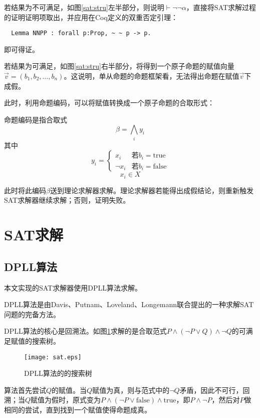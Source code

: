 若结果为不可满足，如图\ref{sat:stru}左半部分，则说明$\vdash \lnot \lnot \alpha$，直接将SAT求解过程的证明证明项取出，并应用在Coq定义的双重否定引理：
\begin{verbatim}
  Lemma NNPP : forall p:Prop, ~ ~ p -> p.
\end{verbatim}
即可得证。

若结果为可满足，如图\ref{sat:stru}右半部分，将得到一个原子命题的赋值向量$\vec{v}=(b_1, b_2, \dots , b_n)$。这说明，单从命题的命题框架看，无法得出命题在赋值$\vec{v}$下成假。

此时，利用命题编码，可以将赋值转换成一个原子命题的合取形式：
\begin{definition}[命题编码]命题编码是指合取式
  $$\beta = \bigwedge_i y_i$$
  其中
  \begin{equation*}
    y_i =
    \begin{cases}
      x_i & \text{若}b_i = \mathrm{true} \\
      \lnot x_i & \text{若}b_i = \mathrm{false}
    \end{cases}
  \end{equation*}
  $$ x_i \in X $$
\end{definition}


此时将此编码$\beta$送到理论求解器求解。理论求解器若能得出成假结论，则重新触发SAT求解器继续求解；否则，证明失败。

\section{SAT求解}
\subsection{DPLL算法}
本文实现的SAT求解器使用DPLL算法求解。

DPLL算法是由Davis、Putnam、Loveland、Longemann联合提出的一种求解SAT问题的完备方法。

DPLL算法的核心是回溯法。如图\ref{sat:dpll}求解的是合取范式$P \land (\lnot P \lor Q) \land \lnot Q$的可满足赋值的搜索树。

\begin{figure}[!htbp]
  \centering
  \texttt{[image: sat.eps]}
  \caption{DPLL算法的的搜索树}
  \label{sat:dpll}
\end{figure}

算法首先尝试$Q$的赋值。当$Q$赋值为真，则与范式中的$\lnot Q$矛盾，因此不可行，回溯；当$Q$赋值为假时，原式变为$P \land (\lnot P \lor \mathrm{false}) \land \mathrm{true}$，即$P \land \lnot P$，然后对$P$做相同的尝试，直到找到一个赋值使得命题成真。

